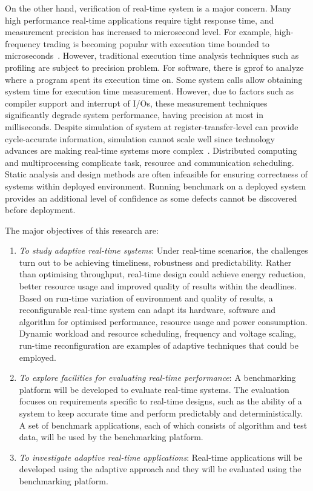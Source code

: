On the other hand, verification of real-time system is a major concern. Many high performance real-time applications require tight response time, and measurement precision has increased to microsecond level. For example, high-frequency trading is becoming popular with execution time bounded to microseconds~\cite{mcgowan10}. However, traditional execution time analysis techniques such as profiling are subject to precision problem. For software, there is gprof to analyze where a program spent its execution time on. Some system calls allow obtaining system time for execution time measurement. However, due to factors such as compiler support and interrupt of I/Os, these measurement techniques significantly degrade system performance, having precision at most in milliseconds.  Despite simulation of system at register-transfer-level can provide cycle-accurate information, simulation cannot scale well since technology advances are making real-time systems more complex~\cite{stankovic88}. Distributed computing and multiprocessing complicate task, resource and communication scheduling. Static analysis and design methods are often infeasible for ensuring correctness of systems within deployed environment. Running benchmark on a deployed system provides an additional level of confidence as some defects cannot be discovered before deployment.

The major objectives of this research are:

\begin{enumerate}
\item \textit{To study adaptive real-time systems}: Under real-time scenarios, the challenges turn out to be achieving timeliness, robustness and predictability. Rather than optimising throughput, real-time design could achieve energy reduction, better resource usage and improved quality of results within the deadlines. Based on run-time variation of environment and quality of results, a reconfigurable real-time system can adapt its hardware, software and algorithm for optimised performance, resource usage and power consumption. Dynamic workload and resource scheduling, frequency and voltage scaling, run-time reconfiguration are examples of adaptive techniques that could be employed.
\item \textit{To explore facilities for evaluating real-time performance}: A benchmarking platform will be developed to evaluate real-time systems. The evaluation focuses on requirements specific to real-time designs, such as the ability of a system to keep accurate time and perform predictably and deterministically. A set of benchmark applications, each of which consists of algorithm and test data, will be used by the benchmarking platform.
\item \textit{To investigate adaptive real-time applications}: Real-time applications will be developed using the adaptive approach and they will be evaluated using the benchmarking platform.
\end{enumerate}


